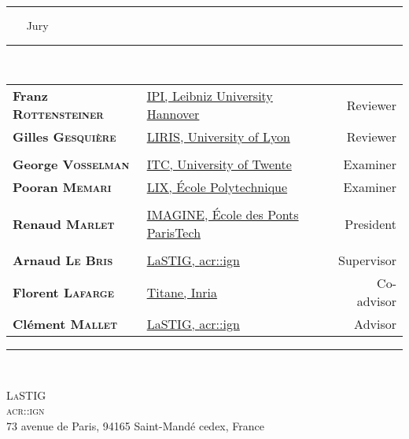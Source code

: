 \begin{titlepage}
\begin{center}
        \rule{.43\textwidth}{1pt} ~~~ {\Large Jury} ~~~ \rule{.43\textwidth}{1pt}\\
        \vspace*{1em}
        \begin{tabular}{l x{.5\textwidth} r}
            \textbf{Franz \textsc{Rottensteiner}} & \href{https://www.ipi.uni-hannover.de/en/rottensteiner/}{IPI, Leibniz University Hannover} & Reviewer \\
            \textbf{Gilles \textsc{Gesquière}} & \href{https://perso.liris.cnrs.fr/gilles.gesquiere/wiki/doku.php}{LIRIS, University of Lyon} & Reviewer \\
             & & \\
            \textbf{George \textsc{Vosselman}} & \href{https://research.utwente.nl/en/persons/george-vosselman}{ITC, University of Twente} & Examiner \\
            \textbf{Pooran \textsc{Memari}} & \href{http://www.lix.polytechnique.fr/~memari/}{LIX, \'Ecole Polytechnique} & Examiner \\
             & & \\
            \textbf{Renaud \textsc{Marlet}} & \href{http://imagine.enpc.fr/~marletr/}{IMAGINE, \'Ecole des Ponts ParisTech} & President \\
             & & \\
            \textbf{Arnaud \textsc{Le Bris}} & \href{http://recherche.ign.fr/labos/matis/~Le_Bris}{LaSTIG, \acrshort*{acr::ign}} & Supervisor \\
            \textbf{Florent \textsc{Lafarge}} & \href{https://www-sop.inria.fr/members/Florent.Lafarge/}{Titane, Inria} & Co-advisor \\
            \textbf{Clément \textsc{Mallet}} & \href{http://recherche.ign.fr/labos/matis/~mallet}{LaSTIG, \acrshort*{acr::ign}} & Advisor \\
        \end{tabular}
        \vspace*{1em}
        \rule{\textwidth}{1pt}\\

        \vfill

        \begin{minipage}{.75\textwidth}
            \centering
            \small
            \textsc{LaSTIG\\ \acrfull*{acr::ign}}\\
            73 avenue de Paris, 94165 Saint-Mandé cedex, France
        \end{minipage}
    \end{center}
\end{titlepage}

